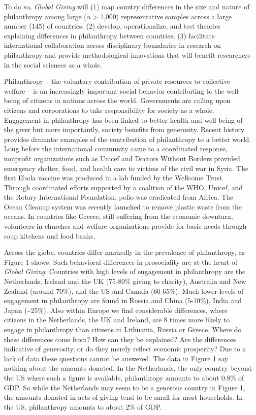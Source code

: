 \documentclass[twocolumn, serif, rga, numeric]{jote-article}
\begin{document}
To do so, \emph{Global Giving} will (1) map country differences in the size and nature of philanthropy among large (\emph{n} \textgreater{}
1,000) representative samples across a large number (145) of countries; (2) develop, operationalize, and test theories explaining differences in philanthropy between countries; (3) facilitate international collaboration across disciplinary boundaries in research on philanthropy and provide methodological innovations that will benefit researchers in the social sciences as a whole.

Philanthropy -- the voluntary contribution of private resources to collective welfare\cite{Smith2006} -- is an increasingly important social behavior contributing to the well-being of citizens in nations across the world. Governments are calling upon citizens and corporations to take responsibility for society as a whole. Engagement in philanthropy has been linked to better health and well-being of the giver\cite{Aknin2013, -5} but more importantly, society benefits from generosity. Recent history provides dramatic examples of the contribution of philanthropy to a better world. Long before the international community came to a coordinated response, nonprofit organizations such as Unicef and Doctors Without Borders provided emergency shelter, food, and health care to victims of the civil war in Syria. The first Ebola vaccine was produced in a lab funded by the Wellcome Trust. Through coordinated efforts supported by a coalition of the WHO, Unicef, and the Rotary International Foundation, polio was eradicated from Africa. The Ocean Cleanup system was recently launched to remove plastic waste from the oceans. In countries like Greece, still suffering from the economic downturn, volunteers in churches and welfare organizations provide for basic needs through soup kitchens and food banks.

Across the globe, countries differ markedly in the prevalence of philanthropy, as Figure 1 shows. Such behavioral differences in prosociality are at the heart of \emph{Global Giving}. Countries with high levels of engagement in philanthropy are the Netherlands, Ireland and the UK (75-80\% giving to charity), Australia and New Zealand (around 70\%), and the US and Canada (60-65\%). Much lower levels of engagement in philanthropy are found in Russia and China (5-10\%), India and Japan (\textasciitilde25\%). Also within Europe we find considerable differences, where citizens in the Netherlands, the UK and Ireland, are 8 times more likely to engage in philanthropy than citizens in Lithuania, Russia or Greece. Where do these differences come from? How can they be explained? Are the differences indicative of generosity, or do they merely reflect economic prosperity? Due to a lack of data these questions cannot be answered. The data in Figure 1 say nothing about the amounts donated. In the Netherlands, the only country beyond the US where such a figure is available, philanthropy amounts to about 0.8\% of GDP.\cite{Bekkers2015b} So while the Netherlands may seem to be a generous country in Figure 1, the amounts donated in acts of giving tend to be small for most households.\cite{Bekkers2015b} In the US, philanthropy amounts to about 2\% of GDP.\cite{Foundation2014}
\end{document}
